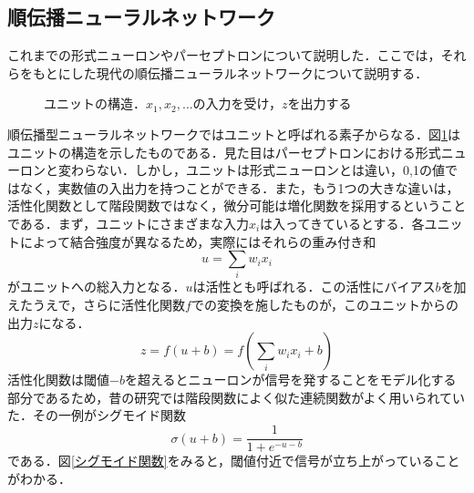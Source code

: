 \documentclass[a4paper,11pt]{jsreport}
\begin{document}
\subsection{順伝播ニューラルネットワーク}
これまでの形式ニューロンやパーセプトロンについて説明した．ここでは，それらをもとにした現代の順伝播ニューラルネットワークについて説明する．\par
\begin{figure}[H]
  \centering
  \caption{ユニットの構造．$x_1,x_2,\dots$の入力を受け，$z$を出力する}
  \label{ユニットの構造}
\end{figure}
順伝播型ニューラルネットワークではユニットと呼ばれる素子からなる．図\ref{ユニットの構造}はユニットの構造を示したものである．見た目はパーセプトロンにおける形式ニューロンと変わらない．しかし，ユニットは形式ニューロンとは違い，0,1の値ではなく，実数値の入出力を持つことができる．また，もう1つの大きな違いは，活性化関数として階段関数ではなく，微分可能は増化関数を採用するということである．まず，ユニットにさまざまな入力$x_i$は入ってきているとする．各ユニットによって結合強度が異なるため，実際にはそれらの重み付き和
\begin{equation}
  u = \sum_{i} w_i x_i
\end{equation}
がユニットへの総入力となる．$u$は活性とも呼ばれる．この活性にバイアス$b$を加えたうえで，さらに活性化関数$f$での変換を施したものが，このユニットからの出力$z$になる．
\begin{equation}
  z = f(u + b) = f\left( \sum_{i} w_i x_i + b \right)
\end{equation}
活性化関数は閾値$-b$を超えるとニューロンが信号を発することをモデル化する部分であるため，昔の研究では階段関数によく似た連続関数がよく用いられていた．その一例がシグモイド関数
\begin{equation}
  \sigma(u + b) = \frac{1}{1 + e^{-u-b}}
\end{equation}
である．図\ref{シグモイド関数}をみると，閾値付近で信号が立ち上がっていることがわかる．
\end{document}
